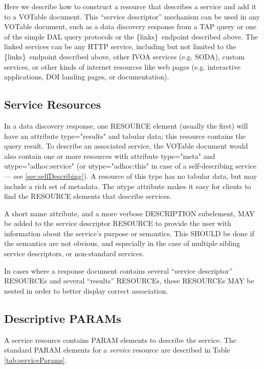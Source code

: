 \documentclass[11pt,a4paper]{ivoa}
\newcommand{\blinks}{\{links\}}
\newcommand{\attval}[2]{#1={\allowbreak}{"}#2{"}}
\begin{document}
Here we describe how to construct a resource that describes a service
and add it to a VOTable document. This ``service descriptor'' mechanism can  
be used in any VOTable document, such as a data discovery response from a TAP query 
or one of the simple DAL query protocols or the \blinks\ endpoint described above. 
The linked services can be any HTTP service, including but not limited to the \blinks\ 
endpoint described above, other IVOA services (e.g. SODA), custom services, or other 
kinds of internet resources like web pages (e.g. interactive applications, DOI landing 
pages, or documentation).

\subsection{Service Resources}
\label{sec:serviceResources}

In a data discovery response, one RESOURCE element (usually the first)
will have an attribute \attval{type}{results} and tabular data; this resource
contains the query result. To describe an associated service, the VOTable document
would also contain one or more resources with attribute \attval{type}{meta} and
\attval{utype}{adhoc:service}  (or \attval{utype}{adhoc:this} in case of
a self-describing service --- see \ref{sec:selfDescribing}). A resource of this 
type has no tabular data, but may include a rich set of metadata. The utype attribute 
makes it easy for clients to find the RESOURCE elements that describe services.

A short name attribute, and a more verbose DESCRIPTION  subelement,
MAY be added to the service descriptor RESOURCE to  provide the user
with information about the service's purpose or  semantics. This SHOULD
be done if the semantics are not obvious,  and especially in the case
of multiple sibling service  descriptors, or non-standard services.

In cases where a response document contains several ``service descriptor'' RESOURCEs
and several ``results'' RESOURCEs, these RESOURCEs MAY be nested in
order to better display correct association.

\subsection{Descriptive PARAMs}

A service resource contains PARAM elements to describe the service.
The standard PARAM elements for a {\em service\/} resource
are described in Table \ref{tab:serviceParams}.
\end{document}
